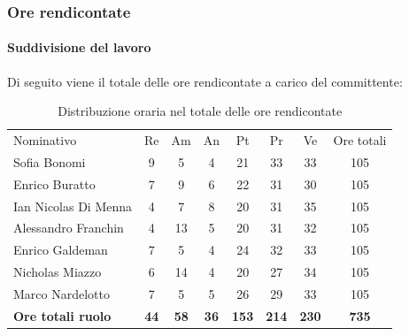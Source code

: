 \documentclass[../piano-di-progetto.tex]{subfiles}
\begin{document}

    \subsubsection{Ore rendicontate}

    \paragraph{Suddivisione del lavoro}
    Di seguito viene il totale delle ore rendicontate a carico del committente:
    \begin{table}[H]
      \begin{tabular}{lccccccc}
        Nominativo                & Re          & Am          & An          & Pt           & Pr           & Ve           & Ore totali   \\
        Sofia Bonomi              & 9           & 5           & 4           & 21           & 33           & 33           & 105          \\
        Enrico Buratto            & 7           & 9           & 6           & 22           & 31           & 30           & 105          \\
        Ian Nicolas Di Menna      & 4           & 7           & 8           & 20           & 31           & 35           & 105          \\
        Alessandro Franchin       & 4           & 13          & 5           & 20           & 31           & 32           & 105          \\
        Enrico Galdeman           & 7           & 5           & 4           & 24           & 32           & 33           & 105          \\
        Nicholas Miazzo           & 6           & 14          & 4           & 20           & 27           & 34           & 105          \\
        Marco Nardelotto          & 7           & 5           & 5           & 26           & 29           & 33           & 105          \\
        \textbf{Ore totali ruolo} & \textbf{44} & \textbf{58} & \textbf{36} & \textbf{153} & \textbf{214} & \textbf{230} & \textbf{735}
      \end{tabular}
      \caption{Distribuzione oraria nel totale delle ore rendicontate}
      \end{table}
  
\end{document}
